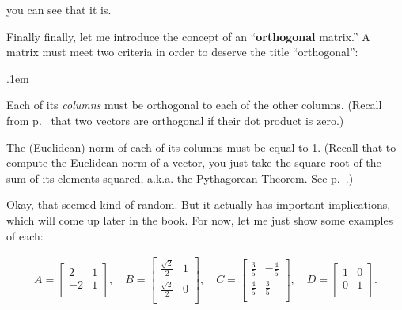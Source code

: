 you can see that it is.

\bigskip


Finally finally, let me introduce the concept of an ``\textbf{orthogonal}
matrix.'' A matrix must meet two criteria in order to deserve the title
``orthogonal'':

\label{orthogonalMatrices}

\begin{compactenum}
\itemsep.1em

\item Each of its \textit{columns} must be orthogonal to each of the other
columns. (Recall from p.~\pageref{orthogonalMeansZeroDotProduct} that two
vectors are orthogonal if their dot product is zero.)

\item The (Euclidean) norm of each of its columns must be equal to 1. (Recall
that to compute the Euclidean norm of a vector, you just take the
square-root-of-the-sum-of-its-elements-squared, a.k.a. the Pythagorean Theorem.
See p.~\pageref{Euclideannorm}.)

\end{compactenum}

Okay, that seemed kind of random. But it actually has important implications,
which will come up later in the book. For now, let me just show some examples
of each:

\vspace{-.15in}
\begingroup
\renewcommand*{\arraystretch}{1.5}
\begin{align*}
A =
\begin{bmatrix}
2 & 1 \\
-2 & 1 \\
\end{bmatrix},\quad
B =
\begin{bmatrix}
\frac{\sqrt{2}}{2} & 1 \\
\frac{\sqrt{2}}{2} & 0 \\
\end{bmatrix},\quad
C =
\begin{bmatrix}
\frac{3}{5} & -\frac{4}{5} \\
\frac{4}{5} & \frac{3}{5} \\
\end{bmatrix},\quad
D =
\begin{bmatrix}
1 & 0 \\
0 & 1 \\
\end{bmatrix}.
\end{align*}
\endgroup


